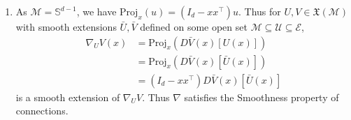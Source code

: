 \documentclass[en, oneside]{assignment}
\begin{document}
\begin{sol}
    \begin{enumerate}[label=(\arabic*)]
        \item As $\mathcal{M} = \mathbb{S}^{d-1}$, we have $\text{Proj} _x (u)= (I_d - x x^\top) u$. 
        Thus for $U, V \in \mathfrak{X} (\mathcal{M})$ 
        with smooth extensions $\bar{U}, \bar{V}$ defined on some open set $\mathcal{M} \subseteq \mathcal{U} \subseteq \mathcal{E}$,
        \begin{align*}
            \nabla _U V (x)&= \text{Proj} _x \left( D \bar{V}(x) [U(x)] \right)\\
            &= \text{Proj} _x \left( D \bar{V} (x) [\bar{U}(x)] \right)\\
            &= (I_d - x x^\top) D \bar{V} (x) [\bar{U}(x)]
        \end{align*}
        is a smooth extension of $\nabla _U V$. Thus $\nabla$ satisfies the Smoothness property of connections.
        

\end{enumerate}
\end{sol}
\end{document}
